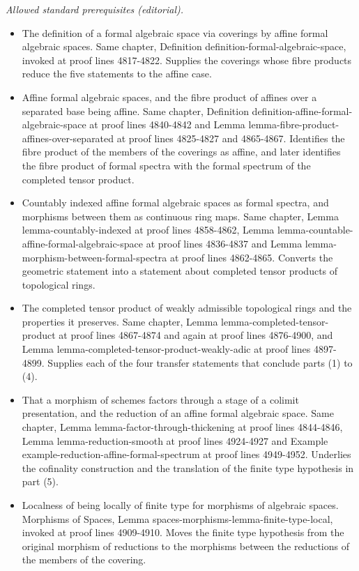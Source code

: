 \documentclass{stacks-project}
\theoremstyle{plain}
\theoremstyle{definition}
\theoremstyle{remark}
\numberwithin{equation}{subsection}
\begin{document}
\noindent\textit{Allowed standard prerequisites (editorial).}\begin{itemize}
\item The definition of a formal algebraic space via coverings by affine formal algebraic spaces. Same chapter, Definition definition-formal-algebraic-space, invoked at proof lines 4817-4822. Supplies the coverings whose fibre products reduce the five statements to the affine case.
\item Affine formal algebraic spaces, and the fibre product of affines over a separated base being affine. Same chapter, Definition definition-affine-formal-algebraic-space at proof lines 4840-4842 and Lemma lemma-fibre-product-affines-over-separated at proof lines 4825-4827 and 4865-4867. Identifies the fibre product of the members of the coverings as affine, and later identifies the fibre product of formal spectra with the formal spectrum of the completed tensor product.
\item Countably indexed affine formal algebraic spaces as formal spectra, and morphisms between them as continuous ring maps. Same chapter, Lemma lemma-countably-indexed at proof lines 4858-4862, Lemma lemma-countable-affine-formal-algebraic-space at proof lines 4836-4837 and Lemma lemma-morphism-between-formal-spectra at proof lines 4862-4865. Converts the geometric statement into a statement about completed tensor products of topological rings.
\item The completed tensor product of weakly admissible topological rings and the properties it preserves. Same chapter, Lemma lemma-completed-tensor-product at proof lines 4867-4874 and again at proof lines 4876-4900, and Lemma lemma-completed-tensor-product-weakly-adic at proof lines 4897-4899. Supplies each of the four transfer statements that conclude parts (1) to (4).
\item That a morphism of schemes factors through a stage of a colimit presentation, and the reduction of an affine formal algebraic space. Same chapter, Lemma lemma-factor-through-thickening at proof lines 4844-4846, Lemma lemma-reduction-smooth at proof lines 4924-4927 and Example example-reduction-affine-formal-spectrum at proof lines 4949-4952. Underlies the cofinality construction and the translation of the finite type hypothesis in part (5).
\item Localness of being locally of finite type for morphisms of algebraic spaces. Morphisms of Spaces, Lemma spaces-morphisms-lemma-finite-type-local, invoked at proof lines 4909-4910. Moves the finite type hypothesis from the original morphism of reductions to the morphisms between the reductions of the members of the covering.
\end{itemize}\medskip
\end{document}
